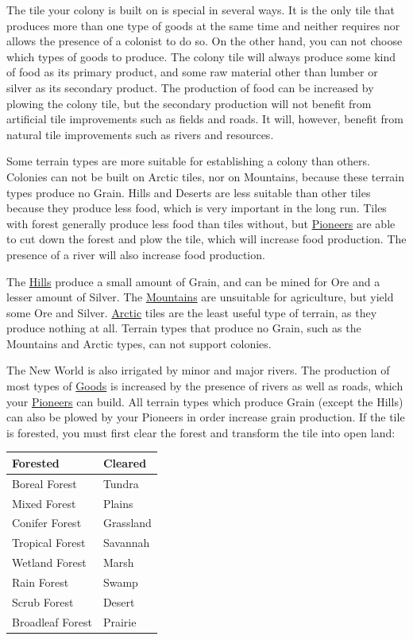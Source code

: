 \documentclass[12pt]{book}
\begin{document}
The tile your colony is built on is special in several ways. It is the
only tile that produces more than one type of goods at the same time
and neither requires nor allows the presence of a colonist to do
so. On the other hand, you can not choose which types of goods to
produce. The colony tile will always produce some kind of food as its
primary product, and some raw material other than lumber or silver as
its secondary product. The production of food can be increased by
plowing the colony tile, but the secondary production will not benefit
from artificial tile improvements such as fields and roads. It will,
however, benefit from natural tile improvements such as rivers and
resources.

Some terrain types are more suitable for establishing a colony than
others. Colonies can not be built on Arctic tiles, nor on Mountains,
because these terrain types produce no Grain. Hills and Deserts are
less suitable than other tiles because they produce less food, which
is very important in the long run. Tiles with forest generally produce
less food than tiles without, but \hyperlink{Pioneer}{Pioneers} are
able to cut down the forest and plow the tile, which will increase
food production. The presence of a river will also increase food
production.

The \hyperlink{Hills}{Hills} produce a small amount of Grain, and can
be mined for Ore and a lesser amount of Silver. The
\hyperlink{Mountains}{Mountains} are unsuitable for agriculture, but
yield some Ore and Silver. \hyperlink{Arctic}{Arctic} tiles are the
least useful type of terrain, as they produce nothing at all. Terrain
types that produce no Grain, such as the Mountains and Arctic types,
can not support colonies.

The New World is also irrigated by minor and major rivers. The
production of most types of \hyperlink{Goods}{Goods} is increased by
the presence of rivers as well as roads, which your
\hyperlink{Pioneer}{Pioneers} can build. All terrain types which
produce Grain (except the Hills) can also be plowed by your Pioneers
in order increase grain production. If the tile is forested, you must
first clear the forest and transform the tile into open land:

\vskip5mm
\begin{tabular}{l @{\hskip5mm$\rightarrow$\hskip5mm} l}
Forested&Cleared\\
\hline
Boreal Forest & Tundra\\
Mixed Forest & Plains\\
Conifer Forest & Grassland\\
Tropical Forest & Savannah\\
Wetland Forest & Marsh\\
Rain Forest & Swamp\\
Scrub Forest & Desert\\
Broadleaf Forest & Prairie\\
\end{tabular}
\vskip5mm
\end{document}
